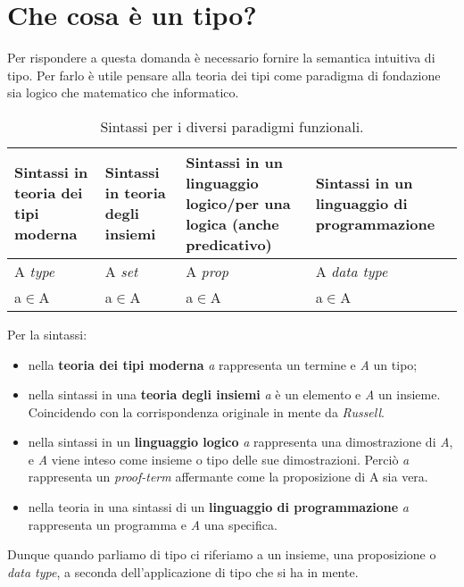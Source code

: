\section{Che cosa \`e un tipo?}
\label{sec:cosa e un tipo}
Per rispondere a questa domanda \`e necessario fornire la semantica intuitiva di tipo. Per farlo \`e utile pensare alla teoria dei tipi come paradigma di fondazione sia logico che matematico che informatico.

\begin{table}[h]
\centering
\begin{tabularx}{\textwidth}{XXXX}
\hline 
\rowcolor{amethyst}
{\color[HTML]{FFFFFF}\textbf{Sintassi in teoria dei tipi moderna}} & {\color[HTML]{FFFFFF}\textbf{Sintassi in teoria degli insiemi}} & {\color[HTML]{FFFFFF} \textbf{Sintassi in un linguaggio logico/per una logica (anche predicativo)}} & {\color[HTML]{FFFFFF}\textbf{Sintassi in un linguaggio di programmazione}} \\
\hline\hline 
A \textit{type} & A \textit{set} & A \textit{prop} & A \textit{data type} \\ 
\hline 
a$\in$A & a$\in$A & a$\in$A & a$\in$A \\ 
\hline 
\end{tabularx}
\caption{\label{tab:sintassi-paradigmi-funzionali}Sintassi per i diversi paradigmi funzionali.} 
\end{table}
\noindent
Per la sintassi:
\begin{itemize} 
\item nella \textbf{teoria dei tipi moderna} \textit{a} rappresenta un termine e \textit{A} un tipo;
\item nella sintassi in una \textbf{teoria degli insiemi} \textit{a} \`e un elemento e \textit{A} un insieme. Coincidendo con la corrispondenza originale in mente da \textit{Russell}.
\item nella sintassi in un \textbf{linguaggio logico} \textit{a} rappresenta una dimostrazione di \textit{A}, e \textit{A} viene inteso come insieme o tipo delle sue dimostrazioni. Perci\`o \textit{a} rappresenta un \textit{proof-term} affermante come la proposizione di A sia vera.
\item nella teoria in una sintassi di un \textbf{linguaggio di programmazione} \textit{a} rappresenta un programma e \textit{A} una specifica.
\end{itemize}
\noindent
Dunque quando parliamo di tipo ci riferiamo a un insieme, una proposizione o \textit{data type}, a seconda dell'applicazione di tipo che si ha in mente.\\\\

